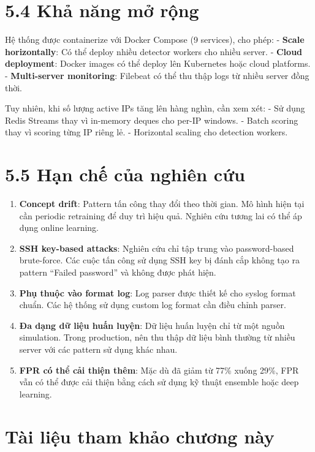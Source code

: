 \documentclass[
  a4paper]{report}
\begin{document}
\section{5.4 Khả năng mở
rộng}\label{khux1ea3-nux103ng-mux1edf-rux1ed9ng}

Hệ thống được containerize với Docker Compose (9 services), cho phép: -
\textbf{Scale horizontally}: Có thể deploy nhiều detector workers cho
nhiều server. - \textbf{Cloud deployment}: Docker images có thể deploy
lên Kubernetes hoặc cloud platforms. - \textbf{Multi-server monitoring}:
Filebeat có thể thu thập logs từ nhiều server đồng thời.

Tuy nhiên, khi số lượng active IPs tăng lên hàng nghìn, cần xem xét: -
Sử dụng Redis Streams thay vì in-memory deques cho per-IP windows. -
Batch scoring thay vì scoring từng IP riêng lẻ. - Horizontal scaling cho
detection workers.

\section{5.5 Hạn chế của nghiên
cứu}\label{hux1ea1n-chux1ebf-cux1ee7a-nghiuxean-cux1ee9u}

\begin{enumerate}
\def\labelenumi{\arabic{enumi}.}
\item
  \textbf{Concept drift}: Pattern tấn công thay đổi theo thời gian. Mô
  hình hiện tại cần periodic retraining để duy trì hiệu quả. Nghiên cứu
  tương lai có thể áp dụng online learning.
\item
  \textbf{SSH key-based attacks}: Nghiên cứu chỉ tập trung vào
  password-based brute-force. Các cuộc tấn công sử dụng SSH key bị đánh
  cắp không tạo ra pattern ``Failed password'' và không được phát hiện.
\item
  \textbf{Phụ thuộc vào format log}: Log parser được thiết kế cho syslog
  format chuẩn. Các hệ thống sử dụng custom log format cần điều chỉnh
  parser.
\item
  \textbf{Đa dạng dữ liệu huấn luyện}: Dữ liệu huấn luyện chỉ từ một
  nguồn simulation. Trong production, nên thu thập dữ liệu bình thường
  từ nhiều server với các pattern sử dụng khác nhau.
\item
  \textbf{FPR có thể cải thiện thêm}: Mặc dù đã giảm từ 77\% xuống 29\%,
  FPR vẫn có thể được cải thiện bằng cách sử dụng kỹ thuật ensemble hoặc
  deep learning.
\end{enumerate}

\section{Tài liệu tham khảo chương
này}\label{tuxe0i-liux1ec7u-tham-khux1ea3o-chux1b0ux1a1ng-nuxe0y}
\end{document}
